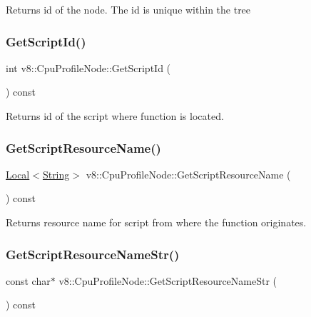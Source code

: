 Returns id of the node. The id is unique within the tree \mbox{\label{classv8_1_1CpuProfileNode_aef0b693911218f14745f2c51b4c9a860}} 
\subsubsection{\texorpdfstring{Get\+Script\+Id()}{GetScriptId()}}
{\footnotesize\ttfamily int v8\+::\+Cpu\+Profile\+Node\+::\+Get\+Script\+Id (\begin{DoxyParamCaption}{ }\end{DoxyParamCaption}) const}

Returns id of the script where function is located. \mbox{\label{classv8_1_1CpuProfileNode_aa827e7c9219cf49bdca2fcff33494ba0}} 
\subsubsection{\texorpdfstring{Get\+Script\+Resource\+Name()}{GetScriptResourceName()}}
{\footnotesize\ttfamily \mbox{\hyperlink{classv8_1_1Local}{Local}}$<$\mbox{\hyperlink{classv8_1_1String}{String}}$>$ v8\+::\+Cpu\+Profile\+Node\+::\+Get\+Script\+Resource\+Name (\begin{DoxyParamCaption}{ }\end{DoxyParamCaption}) const}

Returns resource name for script from where the function originates. \mbox{\label{classv8_1_1CpuProfileNode_acae57cbfbc54cc9c030c31685571096a}} 
\subsubsection{\texorpdfstring{Get\+Script\+Resource\+Name\+Str()}{GetScriptResourceNameStr()}}
{\footnotesize\ttfamily const char$\ast$ v8\+::\+Cpu\+Profile\+Node\+::\+Get\+Script\+Resource\+Name\+Str (\begin{DoxyParamCaption}{ }\end{DoxyParamCaption}) const}

